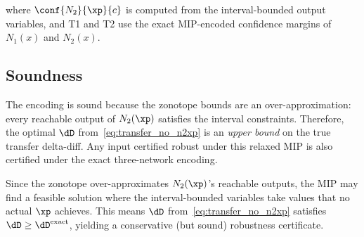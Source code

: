 where $\conf{N_2}{\xp}{c}$ is computed from the interval-bounded output variables, and T1 and T2 use the exact MIP-encoded confidence margins of $N_1(x)$ and $N_2(x)$.

\subsection{Soundness}

The encoding is sound because the zonotope bounds are an over-approximation: every reachable output of $N_2(\xp)$ satisfies the interval constraints. Therefore, the optimal $\dD$ from~\eqref{eq:transfer_no_n2xp} is an \emph{upper bound} on the true transfer delta-diff. Any input certified robust under this relaxed MIP is also certified under the exact three-network encoding.

\begin{remark}
  Since the zonotope over-approximates $N_2(\xp)$'s reachable outputs, the MIP may find a feasible solution where the interval-bounded variables take values that no actual $\xp$ achieves. This means $\dD$ from~\eqref{eq:transfer_no_n2xp} satisfies $\dD \ge \dD^{\mathrm{exact}}$, yielding a conservative (but sound) robustness certificate.
\end{remark}
